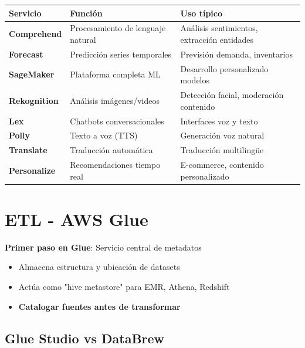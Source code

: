 \documentclass[12pt,a4paper]{report}
\newcommand{\awsservice}[1]{\textcolor{awsorange}{\textbf{#1}}}
\newcommand{\important}[1]{\textcolor{dangerred}{\textbf{#1}}}
\begin{document}
\begin{center}
\begin{longtable}{|p{3cm}|p{5cm}|p{5cm}|}
\hline
\cellcolor{awsblue!20}\textbf{Servicio} & \cellcolor{awsblue!20}\textbf{Función} & \cellcolor{awsblue!20}\textbf{Uso típico} \\
\hline
\awsservice{Comprehend} & Procesamiento de lenguaje natural & Análisis sentimientos, extracción entidades \\
\hline
\awsservice{Forecast} & Predicción series temporales & Previsión demanda, inventarios \\
\hline
\cellcolor{successgreen!20}\awsservice{SageMaker} & Plataforma completa ML & Desarrollo personalizado modelos \\
\hline
\awsservice{Rekognition} & Análisis imágenes/videos & Detección facial, moderación contenido \\
\hline
\awsservice{Lex} & Chatbots conversacionales & Interfaces voz y texto \\
\hline
\awsservice{Polly} & Texto a voz (TTS) & Generación voz natural \\
\hline
\awsservice{Translate} & Traducción automática & Traducción multilingüe \\
\hline
\awsservice{Personalize} & Recomendaciones tiempo real & E-commerce, contenido personalizado \\
\hline
\end{longtable}
\end{center}

\section{ETL - AWS Glue}

\begin{conceptbox}
\textbf{Primer paso en Glue}: Servicio central de metadatos
\begin{itemize}
    \item Almacena estructura y ubicación de datasets
    \item Actúa como "hive metastore" para EMR, Athena, Redshift
    \item \important{Catalogar fuentes antes de transformar}
\end{itemize}
\end{conceptbox}

\subsection{Glue Studio vs DataBrew}
\end{document}
